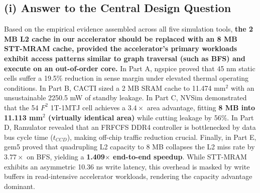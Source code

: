 \documentclass[10pt,a4paper,twocolumn]{article}
\begin{document}
\subsection*{(i) Answer to the Central Design Question}
Based on the empirical evidence assembled across all five simulation tools, \textbf{the 2 MB L2 cache in our accelerator should be replaced with an 8 MB STT-MRAM cache, provided the accelerator's primary workloads exhibit access patterns similar to graph traversal (such as BFS) and execute on an out-of-order core.} In Part A, ngspice proved that 45 nm static cells suffer a 19.5\% reduction in sense margin under elevated thermal operating conditions. In Part B, CACTI sized a 2 MB SRAM cache to 11.474 mm$^2$ with an unsustainable 2250.5 mW of standby leakage. In Part C, NVSim demonstrated that the 54 $F^2$ 1T-1MTJ cell achieves a $3.4\times$ area advantage, fitting \textbf{8 MB into 11.113 mm$^2$ (virtually identical area)} while cutting leakage by 56\%. In Part D, Ramulator revealed that an FRFCFS DDR4 controller is bottlenecked by data bus cycle time ($t_{CCD}$), making off-chip traffic reduction crucial. Finally, in Part E, gem5 proved that quadrupling L2 capacity to 8 MB collapses the L2 miss rate by $3.77\times$ on BFS, yielding a \textbf{1.409$\times$ end-to-end speedup}. While STT-MRAM exhibits an asymmetric 10.36 ns write latency, this overhead is masked by write buffers in read-intensive accelerator workloads, rendering the capacity advantage dominant.
\end{document}
